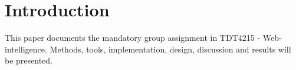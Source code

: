 \chapter{Introduction}
This paper documents the mandatory group assignment in TDT4215 - Web-intelligence. Methods, tools, implementation, design, discussion and results will be presented.